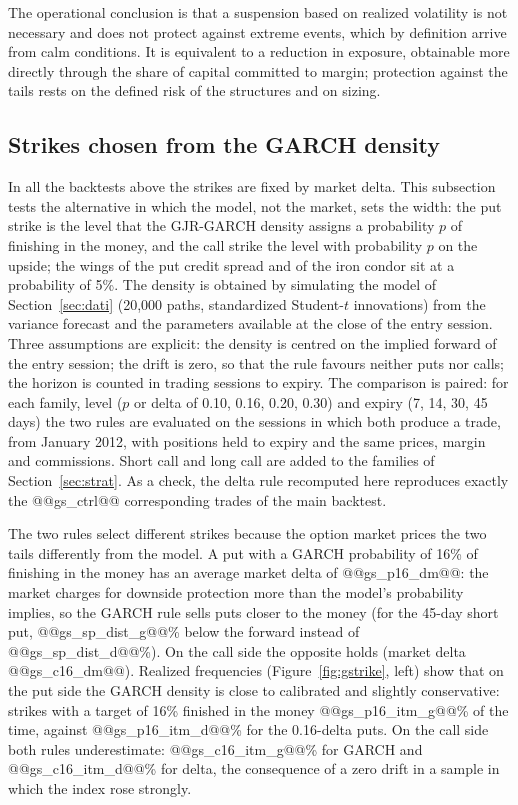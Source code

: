\documentclass[11pt,a4paper]{article}
\begin{document}
The operational conclusion is that a suspension based on realized volatility is not necessary and does not protect against extreme events, which by definition arrive from calm conditions. It is equivalent to a reduction in exposure, obtainable more directly through the share of capital committed to margin; protection against the tails rests on the defined risk of the structures and on sizing.

\subsection{Strikes chosen from the GARCH density}\label{sec:gstrike}

In all the backtests above the strikes are fixed by market delta. This subsection tests the alternative in which the model, not the market, sets the width: the put strike is the level that the GJR-GARCH density assigns a probability $p$ of finishing in the money, and the call strike the level with probability $p$ on the upside; the wings of the put credit spread and of the iron condor sit at a probability of 5\%. The density is obtained by simulating the model of Section~\ref{sec:dati} (20,000 paths, standardized Student-$t$ innovations) from the variance forecast and the parameters available at the close of the entry session. Three assumptions are explicit: the density is centred on the implied forward of the entry session; the drift is zero, so that the rule favours neither puts nor calls; the horizon is counted in trading sessions to expiry. The comparison is paired: for each family, level ($p$ or delta of 0.10, 0.16, 0.20, 0.30) and expiry (7, 14, 30, 45 days) the two rules are evaluated on the sessions in which both produce a trade, from January 2012, with positions held to expiry and the same prices, margin and commissions. Short call and long call are added to the families of Section~\ref{sec:strat}. As a check, the delta rule recomputed here reproduces exactly the @@gs_ctrl@@ corresponding trades of the main backtest.

The two rules select different strikes because the option market prices the two tails differently from the model. A put with a GARCH probability of 16\% of finishing in the money has an average market delta of @@gs_p16_dm@@: the market charges for downside protection more than the model's probability implies, so the GARCH rule sells puts closer to the money (for the 45-day short put, @@gs_sp_dist_g@@\% below the forward instead of @@gs_sp_dist_d@@\%). On the call side the opposite holds (market delta @@gs_c16_dm@@). Realized frequencies (Figure~\ref{fig:gstrike}, left) show that on the put side the GARCH density is close to calibrated and slightly conservative: strikes with a target of 16\% finished in the money @@gs_p16_itm_g@@\% of the time, against @@gs_p16_itm_d@@\% for the 0.16-delta puts. On the call side both rules underestimate: @@gs_c16_itm_g@@\% for GARCH and @@gs_c16_itm_d@@\% for delta, the consequence of a zero drift in a sample in which the index rose strongly.
\end{document}

